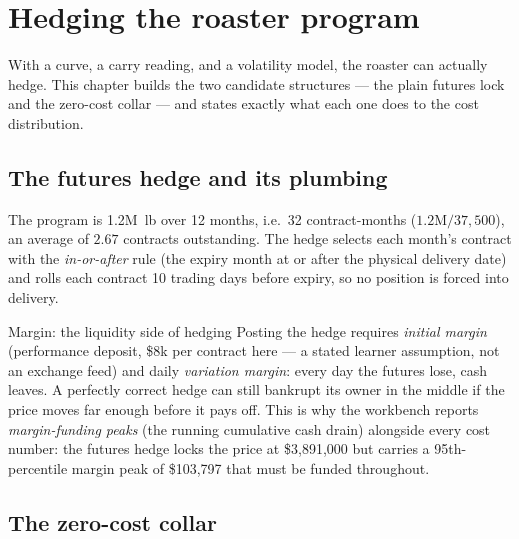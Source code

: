\documentclass[11pt,a4paper]{article}
\newcommand{\usd}{\$}
\begin{document}
\section{Hedging the roaster program}
\label{ch:hedge}

With a curve, a carry reading, and a volatility model, the roaster can
actually hedge. This chapter builds the two candidate structures --- the
plain futures lock and the zero-cost collar --- and states exactly what
each one does to the cost distribution.

\subsection{The futures hedge and its plumbing}

The program is 1.2M~lb over 12 months, i.e.\ 32 contract-months
($1.2\mathrm{M}/37{,}500$), an average of $2.67$ contracts outstanding.
The hedge selects each month's contract with the \emph{in-or-after} rule
(the expiry month at or after the physical delivery date) and rolls each
contract 10 trading days before expiry, so no position is forced into
delivery.

\begin{concept}{Margin: the liquidity side of hedging}
Posting the hedge requires \emph{initial margin} (performance deposit,
\usd{}8k per contract here --- a stated learner assumption, not an
exchange feed) and daily \emph{variation margin}: every day the futures
lose, cash leaves. A perfectly correct hedge can still bankrupt its owner
in the middle if the price moves far enough before it pays off. This is
why the workbench reports \emph{margin-funding peaks} (the running
cumulative cash drain) alongside every cost number: the futures hedge
locks the price at \usd{}3{,}891{,}000 but carries a 95th-percentile
margin peak of \usd{}103{,}797 that must be funded throughout.
\end{concept}

\subsection{The zero-cost collar}
\end{document}
